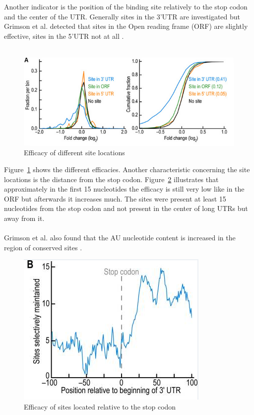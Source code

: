 \documentclass[12pt]{article}
\begin{document}
Another indicator is the position of the binding site relatively to the stop codon and the center of the UTR. Generally sites in the 3'UTR are investigated but Grimson et al. detected that sites in the Open reading frame (ORF) are slightly effective, sites in the 5'UTR not at all \cite{Grimson}. \\\\

\begin{figure}[h]
\centering
\includegraphics[scale=0.6]{results/sites_orf.PNG}
\caption{Efficacy of different site locations}
\label{siteorf}
\end{figure}

Figure~\ref{siteorf} shows the different efficacies. Another characteristic concerning the site locations is the distance from the stop codon. Figure~\ref{sitestop} illustrates that approximately in the first 15 nucleotides the efficacy is still very low like in the ORF but afterwards it increases much. 
The sites were present at least 15 nucleotides from the stop codon and not present in the center of long UTRs but away from it. \\\\

Grimson et al. also found that the AU nucleotide content is increased in the region of conserved sites \cite{Grimson}.

\begin{figure}[h]
\centering
\includegraphics[scale=0.5]{results/site_stop.PNG} 
\caption{Efficacy of sites located relative to the stop codon}
\label{sitestop}
\end{figure}
\end{document}
